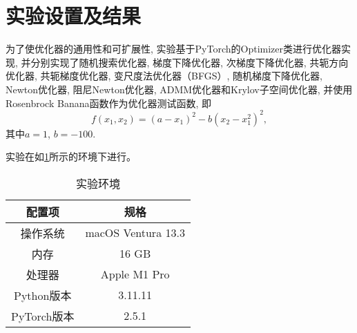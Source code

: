\section{实验设置及结果}

为了使优化器的通用性和可扩展性, 实验基于PyTorch的Optimizer类进行优化器实现, 并分别实现了随机搜索优化器, 梯度下降优化器, 次梯度下降优化器, 共轭方向优化器, 共轭梯度优化器, 变尺度法优化器（BFGS）, 随机梯度下降优化器, Newton优化器, 阻尼Newton优化器, ADMM优化器和Krylov子空间优化器, 并使用Rosenbrock Banana函数作为优化器测试函数, 即
\begin{equation*}
    f(x_1, x_2)=(a-x_1)^2-b(x_2-x_1^2)^2,
\end{equation*}
其中$a=1$, $b=-100$.

实验在如\cref{table:exp env}所示的环境下进行。
\begin{table}[ht]
    \centering
    \caption{实验环境}
    \label{table:exp env}
    \begin{tabular}{cc}
        \toprule
        配置项 & 规格 \\
        \midrule
        操作系统 & macOS Ventura 13.3 \\
        内存 & 16 GB \\
        处理器 & Apple M1 Pro \\
        Python版本 & 3.11.11 \\
        PyTorch版本 & 2.5.1 \\
        \bottomrule
    \end{tabular}
\end{table}
